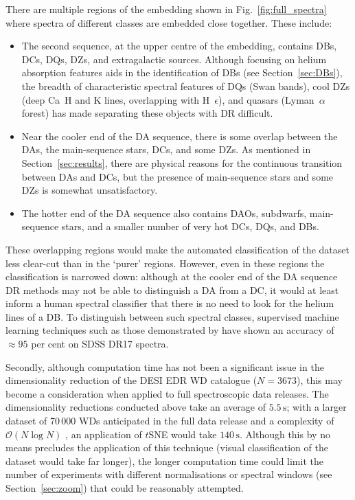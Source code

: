 \documentclass[fleqn,usenatbib]{mnras}
\begin{document}
There are multiple regions of the embedding shown in Fig.~\ref{fig:full_spectra} where spectra of different classes are embedded close together.
These include:
\begin{itemize}
\item
The second sequence, at the upper centre of the embedding, contains DBs, DCs, DQs, DZs, and extragalactic sources.
Although focusing on helium absorption features aids in the identification of DBs (see Section~\ref{sec:DBs}), the breadth of characteristic spectral features of DQs (Swan bands), cool DZs (deep Ca~H and K lines, overlapping with H~$\epsilon$), and quasars (Lyman~$\alpha$ forest) has made separating these objects with DR difficult.
\item
Near the cooler end of the DA sequence, there is some overlap between the DAs, the main-sequence stars, DCs, and some DZs.
As mentioned in Section~\ref{sec:results}, there are physical reasons for the continuous transition between DAs and DCs, but the presence of main-sequence stars and some DZs is somewhat unsatisfactory.
\item
The hotter end of the DA sequence also contains DAOs, subdwarfs, main-sequence stars, and a smaller number of very hot DCs, DQs, and DBs.
\end{itemize}
These overlapping regions would make the automated classification of the dataset less clear-cut than in the `purer' regions.
However, even in these regions the classification is narrowed down: although at the cooler end of the DA sequence DR methods may not be able to distinguish a DA from a DC, it would at least inform a human spectral classifier that there is no need to look for the helium lines of a DB.
To distinguish between such spectral classes, supervised machine learning techniques such as those demonstrated by \citet{vincent23} have shown an accuracy of $\approx 95$ per cent on SDSS DR17 spectra.

Secondly, although computation time has not been a significant issue in the dimensionality reduction of the DESI EDR WD catalogue ($N=3673$), this may become a consideration when applied to full spectroscopic data releases.
The dimensionality reductions conducted above take an average of $5.5\,\text{s}$; with a larger dataset of 70\,000 WDs anticipated in the full data release \citep{cooper23} and a complexity of $\mathcal{O}(N \log N)$ \citep{barneshut, vandermaaten14}, an application of $t$SNE would take $140\,\text{s}$.
Although this by no means precludes the application of this technique (visual classification of the dataset would take far longer), the longer computation time could limit the number of experiments with different normalisations or spectral windows (see Section~\ref{sec:zoom}) that could be reasonably attempted.
\end{document}
